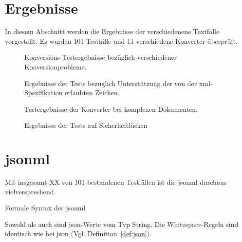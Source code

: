 \chapter{Ergebnisse} \label{chap:results}

In diesem Abschnitt werden die Ergebnisse der verschiedenene Textfälle vorgestellt. Es wurden 101 Testfälle und 11 verschiedene Konverter überprüft.

\begin{figure}[b!]
    \label{fig:results-basic}
    
    \caption{Konversions-Testergebnisse bezüglich verschiedener Konversionprobleme.}
\end{figure}

\begin{figure}[b!]
    \label{fig:results-chars}
    
    \caption{Ergebnisse der Tests bezüglich Unterstützung der von der \acrshort{xml}-Spezifikation erlaubten Zeichen.}
\end{figure}

\begin{figure}[b!]
    \label{fig:results-complex}
    
    \caption{Testergebnisse der Konverter bei komplexen Dokumenten.}
\end{figure}

\begin{figure}[b!]
    \label{fig:results-sec}
    
    \caption{Ergebnisse der Tests auf Sicherheitlücken}
\end{figure}


\chapter{\acrfull{jsonml}}

Mit insgesamt XX von 101 bestandenen Testfällen ist die \acrfull{jsonml} durchaus vielversprechend.

\begin{definition}Formale Syntax der \acrfull{jsonml}
\label{def:jsonml}

Sowohl  als auch  sind \acrshort{json}-Werte vom Typ String. Die Whitespace-Regeln sind identisch wie bei \acrshort{json} (Vgl. Definition~\ref{def:json}).

\begin{grammar}
    
\end{grammar}
\end{definition}

